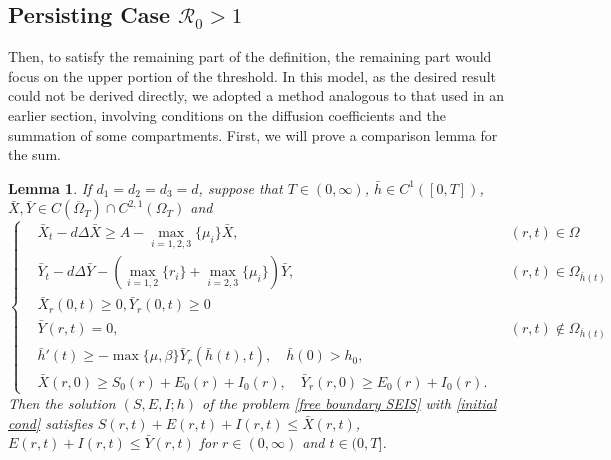 \documentclass[11pt]{amsart}
\numberwithin{equation}{section}
\theoremstyle{plain}
\newtheorem{lemma}[theorem]{Lemma}
\theoremstyle{definition}
\begin{document}
\subsection{Persisting Case $\mathcal R_0>1$}
Then, to satisfy the remaining part of the definition, the remaining part would focus on the upper portion of the threshold. In this model, as the desired result could not be derived directly, we adopted a method analogous to that used in an earlier section, involving conditions on the diffusion coefficients and the summation of some compartments. First, we will prove a comparison lemma for the sum.
\begin{lemma} \label{comparison lem of sum}
If $d_1=d_2=d_3=d$, suppose that $T\in (0, \infty)$, $\bar h \in C^1([0,T])$, $\bar X, \bar Y \in C(\overline\Omega_T) \cap C^{2,1}(\Omega_T)$ and
\begin{equation*}
	\left \{ \begin{aligned}
		&\bar{X}_t-d\Delta \bar{X} \geq A - \max_{i=1,2,3} \{ \mu _i\} \bar{X}, &&(r,t)\in \Omega\\
		&\bar{Y}_t-d\Delta \bar{Y} -(\max_{i=1,2}\{r_i\}+\max_{i=2,3}\{\mu_i\})\bar{Y}, &&(r,t)\in \Omega_{\overline h(t)}\\
		&\bar{X}_r(0,t)\geq 0, \bar{Y}_r(0,t) \geq 0\\
		&\bar{Y}(r,t)=0, &&(r,t)\notin \Omega_{\overline h(t)}\\
		&\bar{h}'(t) \geq -\max\{\mu,\beta\}\bar{Y}_r(\bar{h}(t),t),\quad \bar{h}(0)>h_0,\\
		&\bar{X}(r,0) \geq S_0(r)+E_0(r)+I_0(r),\quad \bar{Y}_r(r,0)\geq E_0(r)+I_0(r).
	\end{aligned}
	\right.
\end{equation*}
Then the solution $(S,E,I;h)$ of the problem \cref{free boundary SEIS} with \cref{initial cond} satisfies $S(r,t)+E(r,t)+I(r,t)\leq\bar{X}(r,t)$, $E(r,t)+I(r,t)\leq\bar{Y}(r,t)$ for $r\in (0,\infty)$ and $t\in (0,T]$.
\end{lemma}
\end{document}
